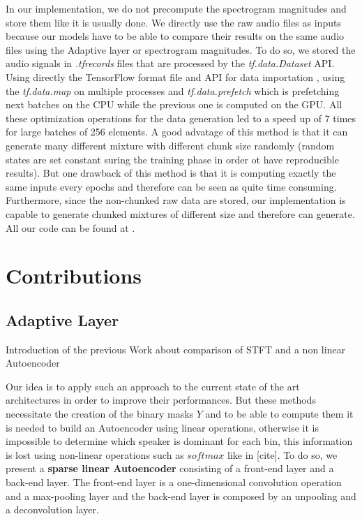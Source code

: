 \documentclass[master,final,11pt]{iscs-thesis}
\begin{document}
In our implementation, we do not precompute the spectrogram magnitudes and store them like it is usually done. We directly use the raw audio files as inputs because our models have to be able to compare their results on the same audio files using the Adaptive layer or spectrogram magnitudes. To do so, we stored the audio signals in \textit{.tfrecords} files that are processed by the \textit{tf.data.Dataset} API. Using directly the TensorFlow format file and API for data importation , using the \textit{tf.data.map} on multiple processes and \textit{tf.data.prefetch} which is prefetching next batches on the CPU while the previous one is computed on the GPU. All these optimization operations for the data generation led to a speed up of 7 times for large batches of 256 elements. A good advatage of this method is that it can generate many different mixture with different chunk size randomly (random states are set constant suring the training phase in order ot have reproducible results). But one drawback of this method is that it is computing exactly the same inputs every epochs and therefore can be seen as quite time consuming.
 Furthermore, since the non-chunked raw data are stored, our implementation is capable to generate chunked mixtures of different size and therefore can generate. All our code can be found at \cite{github}.

\chapter{Contributions}

\section{Adaptive Layer}


Introduction of the previous Work about comparison of STFT and a non linear Autoencoder 

Our idea is to apply such an approach to the current state of the art architectures in order to improve their performances. But these methods necessitate the creation of the binary masks $Y$ and to be able to compute them it is needed to build an Autoencoder using linear operations, otherwise it is impossible to determine which speaker is dominant for each bin, this information is lost using non-linear operations such as $softmax$ like in [cite]. To do so, we present a \textbf{sparse linear Autoencoder} consisting of a front-end layer and a back-end layer. The front-end layer is a one-dimensional convolution operation and a max-pooling layer and the back-end layer is composed by an unpooling and a deconvolution layer.
\end{document}
